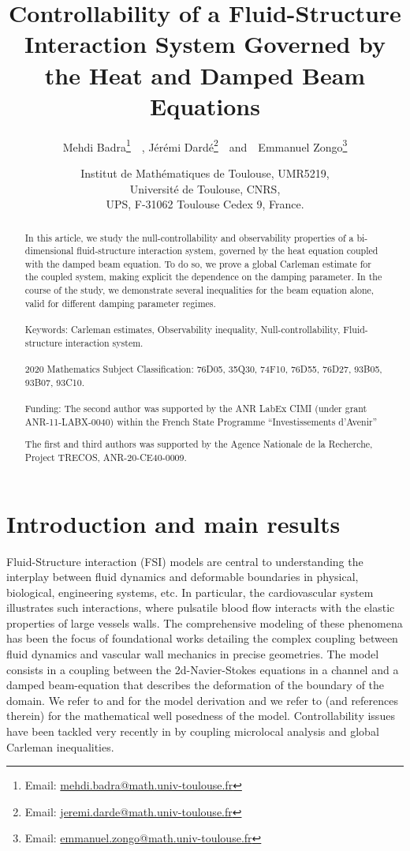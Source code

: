 \documentclass[a4paper, 12pt]{article}
\title{Controllability of a Fluid-Structure Interaction System Governed by the Heat and Damped Beam Equations }
\author{Mehdi Badra\footnote{Email: \href{mailto:le mail de X}{mehdi.badra@math.univ-toulouse.fr}}~~, J\'er\'emi Dard\'e\footnote{Email: \href{mailto:le mail de Y}{jeremi.darde@math.univ-toulouse.fr}}~~and~~Emmanuel Zongo\footnote{Email: \href{mailto:}{emmanuel.zongo@math.univ-toulouse.fr}}}
\date{
	\footnotesize{Institut de Math\'ematiques de Toulouse, UMR5219,\\ Universit\'e de Toulouse, CNRS, \\ UPS, F-31062 Toulouse Cedex 9, France.}
}
\def\textbf{} %
\theoremstyle{plain}
\theoremstyle{definition}
\numberwithin{theorem}{section}
\numberwithin{equation}{section}
\begin{document}
\maketitle
\begin{abstract}
In this article, we study the null-controllability and observability properties of a bi-dimensio\-nal fluid-structure interaction system, governed by the heat equation coupled with the damped beam equation.
To do so, we prove a global Carleman estimate for the coupled system, making explicit the dependence on the damping parameter. 
In the course of the study, we demonstrate several inequalities for the beam equation alone, valid for different damping parameter regimes.
\\
\\
\textbf{Keywords:} Carleman estimates, Observability inequality, Null-controllability, Fluid-structure interaction system.\\
\\
\textbf{ 2020 Mathematics Subject Classification:} 76D05, 35Q30, 74F10, 76D55, 76D27, 93B05, 93B07, 93C10.\\
\\
\textbf{ Funding:} The second author was supported by the ANR LabEx CIMI (under grant ANR-11-LABX-0040) within the French State Programme “Investissements d’Avenir”

The first and third authors was supported by the Agence Nationale de la Recherche, Project
 TRECOS, ANR-20-CE40-0009.
\end{abstract}
\tableofcontents
\section{Introduction and main results}

Fluid-Structure interaction (FSI) models are central to understanding the interplay between fluid dynamics and deformable boundaries in physical, biological, engineering systems, etc. In particular, the cardiovascular system illustrates such interactions, where pulsatile blood flow interacts with the elastic properties of large vessels walls. The comprehensive modeling of these phenomena has been the focus of foundational works detailing the complex coupling between fluid dynamics and vascular wall mechanics in precise geometries. The model consists in a coupling between the 2d-Navier-Stokes equations in a channel and a damped beam-equation that describes the deformation of the boundary of the domain. We refer to \cite{quarteroni} and \cite{GrandmontMaday2003} for the model derivation and we refer to \cite{Grandmont2019} (and references therein) for the mathematical well posedness of the model. Controllability issues have been tackled very recently in \cite{Buffe, Buffe2025} by coupling microlocal analysis and global Carleman inequalities.
\end{document}
